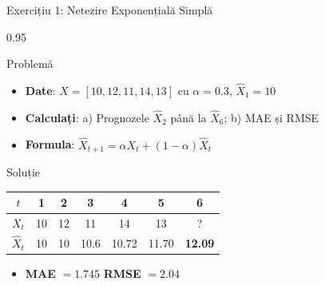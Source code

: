 \documentclass[9pt, aspectratio=169, t]{beamer}
\begin{document}
\begin{frame}{Exercițiu 1: Netezire Exponențială Simplă}
    \begin{cminipage}{0.95\textwidth}
    \begin{alertblock}{Problemă}
        \begin{itemize}\setlength{\itemsep}{0pt}
            \item \textbf{Date}: $X = [10, 12, 11, 14, 13]$ cu $\alpha = 0.3$, $\hat{X}_1 = 10$
            \item \textbf{Calculați}: a) Prognozele $\hat{X}_2$ până la $\hat{X}_6$; b) MAE și RMSE
            \item \textbf{Formula}: $\hat{X}_{t+1} = \alpha X_t + (1-\alpha)\hat{X}_t$
        \end{itemize}
    \end{alertblock}

    \vspace{0.2cm}
    \begin{exampleblock}{Soluție}
        \begin{center}
        \small
        \begin{tabular}{c|ccccc|c}
            $t$ & 1 & 2 & 3 & 4 & 5 & 6\\
            \hline
            $X_t$ & 10 & 12 & 11 & 14 & 13 & ?\\
            $\hat{X}_t$ & 10 & 10 & 10.6 & 10.72 & 11.70 & \textbf{12.09}\\
        \end{tabular}
        \end{center}
        \begin{itemize}\setlength{\itemsep}{0pt}
            \item \textbf{MAE} $= 1.745$ \quad \textbf{RMSE} $= 2.04$
        \end{itemize}
    \end{exampleblock}
    \end{cminipage}
\end{frame}
\end{document}
